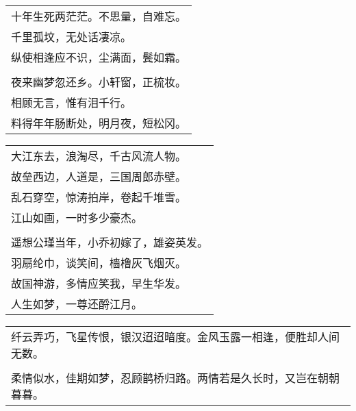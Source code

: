 \noindent\begin{minipage}{\linewidth}
  \vskip-3pt\begin{table}[H]
    \centering
    \begin{tabular}{@{}l@{}}
十年生死两茫茫。不思量，自难忘。\\
千里孤坟，无处话凄凉。\\
纵使相逢应不识，尘满面，鬓如霜。\\
\\
夜来幽梦忽还乡。小轩窗，正梳妆。\\
相顾无言，惟有泪千行。\\
料得年年肠断处，明月夜，短松冈。
    \end{tabular}
  \end{table}
\end{minipage}
\vspace{1cm}


\noindent\begin{minipage}{\linewidth}
  \vskip-3pt\begin{table}[H]
    \centering
    \begin{tabular}{@{}l@{}}
大江东去，浪淘尽，千古风流人物。\\
故垒西边，人道是，三国周郎赤壁。\\
乱石穿空，惊涛拍岸，卷起千堆雪。\\
江山如画，一时多少豪杰。\\
\\
遥想公瑾当年，小乔初嫁了，雄姿英发。\\
羽扇纶巾，谈笑间，樯橹灰飞烟灭。\\
故国神游，多情应笑我，早生华发。\\
人生如梦，一尊还酹江月。
    \end{tabular}
  \end{table}
\end{minipage}
\vspace{1cm}


\noindent\begin{minipage}{\linewidth}
  \vskip-3pt\begin{table}[H]
    \centering
    \begin{tabular}{@{}l@{}}
纤云弄巧，飞星传恨，银汉迢迢暗度。金风玉露一相逢，便胜却人间无数。\\
\\
柔情似水，佳期如梦，忍顾鹊桥归路。两情若是久长时，又岂在朝朝暮暮。
    \end{tabular}
  \end{table}
\end{minipage}
\vspace{1cm}


